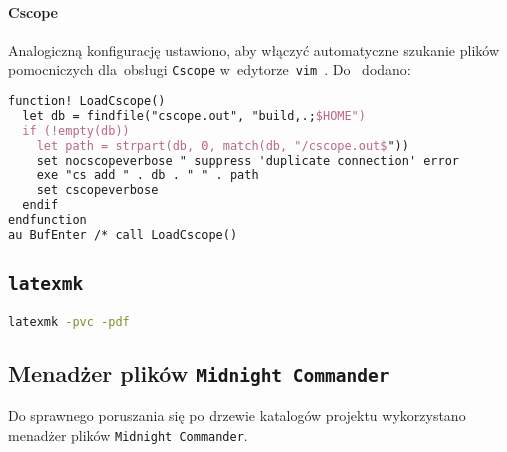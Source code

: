 \documentclass[thesis]{subfiles}
\begin{document}
\paragraph{Cscope}

Analogiczną konfigurację ustawiono, aby włączyć automatyczne szukanie plików pomocniczych dla~obsługi \texttt{Cscope} w~edytorze~\texttt{vim}~\cite{cscope,cscope-autoload}. Do~ dodano:
\begin{lstlisting}[language=tex,numbers=none,caption={Konfiguracja \texttt{Cscope} w~\texttt{.vimrc}}]
function! LoadCscope()
  let db = findfile("cscope.out", "build,.;$HOME")
  if (!empty(db))
    let path = strpart(db, 0, match(db, "/cscope.out$"))
    set nocscopeverbose " suppress 'duplicate connection' error
    exe "cs add " . db . " " . path
    set cscopeverbose
  endif
endfunction
au BufEnter /* call LoadCscope()
\end{lstlisting}

\subsection{\texttt{latexmk}}

\begin{lstlisting}[language=bash,numbers=none,caption={Uruchomienie ciągłej kompilacji \LaTeX do PDF}]
latexmk -pvc -pdf
\end{lstlisting}

\subsection{Menadżer plików \texttt{Midnight Commander}}

Do sprawnego poruszania się po drzewie katalogów projektu wykorzystano menadżer plików \texttt{Midnight~Commander}.
\end{document}
